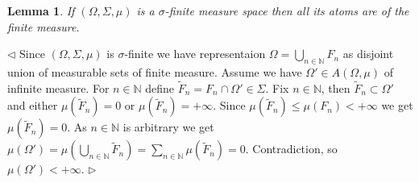\documentclass[12pt]{article}
\newtheorem{lemma}[theorem]{Lemma}
\newenvironment{proof}{\par $\triangleleft$}{$\triangleright$}
\begin{document}
\begin{lemma}\label{AtomDescInSigmFinMeasSp} If $(\Omega,\Sigma,\mu)$ is a
    $\sigma$-finite measure space then all its atoms are of the finite measure.
\end{lemma}
\begin{proof} Since $(\Omega,\Sigma,\mu)$ is $\sigma$-finite we have
    representaion $\Omega=\bigcup_{n\in\mathbb{N}} F_n$ as disjoint union of
    measurable sets of finite measure. Assume we have $\Omega'\in A(\Omega,\mu)$
    of infinite measure. For $n\in\mathbb{N}$ define
    $\widetilde{F}_n=F_n\cap \Omega'\in\Sigma$. Fix $n\in\mathbb{N}$, then
    $\widetilde{F}_n\subset\Omega'$
    and either $\mu(\widetilde{F}_n)=0$ or $\mu(\widetilde{F}_n)=+\infty$. Since
    $\mu(\widetilde{F}_n)\leq\mu(F_n)<+\infty$ we get $\mu(\widetilde{F}_n)=0$.
    As $n\in\mathbb{N}$ is arbitrary we get
    $\mu(\Omega')=\mu(\bigcup_{n\in\mathbb{N}}\widetilde{F}_n)
        =\sum_{n\in\mathbb{N}}\mu(\widetilde{F}_n)=0$.
    Contradiction, so $\mu(\Omega')<+\infty$.
\end{proof}
\end{document}
